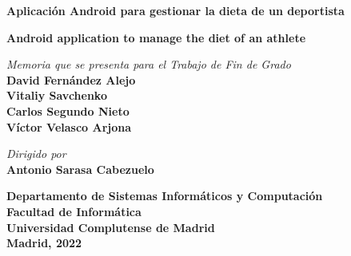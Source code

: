 \begin{titlepage}
\vspace{4cm}
\centering
{\textsf{\huge  \textbf{Aplicación Android para gestionar la dieta de un deportista}}}

\vspace{0.3cm}

{\textsf{\large \textbf{Android application to manage the diet of an athlete} }}

\vspace{7cm}
\textit{Memoria que se presenta para el Trabajo de Fin de Grado}\\
\vspace{5mm}
{\large \textbf{ David Fernández Alejo\\ Vitaliy Savchenko\\ Carlos Segundo Nieto\\ Víctor Velasco Arjona}}

\vspace{2cm}
\textit{Dirigido por}\\
\vspace{5mm}
{\bfseries Antonio Sarasa Cabezuelo}

\vfill

\textbf{{Departamento de Sistemas Informáticos y Computación\\
Facultad de Informática\\
Universidad Complutense de Madrid}}\\
\vspace{5mm}
\textbf{Madrid, 2022}
\end{titlepage}
\fantasma